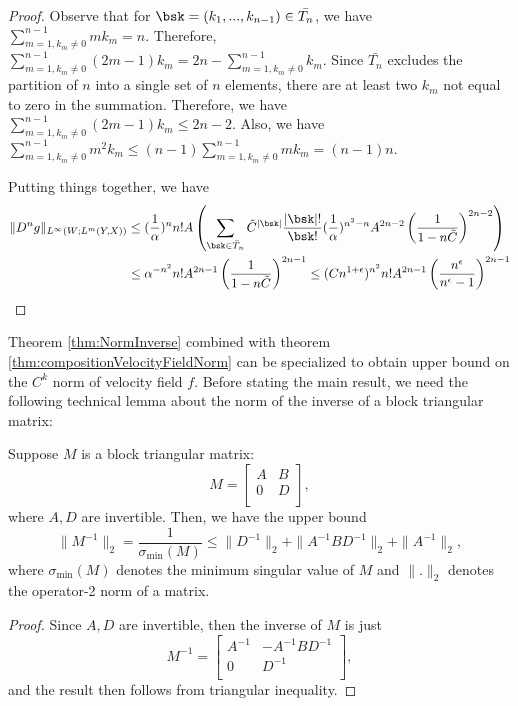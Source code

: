\begin{proof}
Observe that for $\bsk = (k_1,...,k_{n-1}) \in \bar{T_n}$, we have $\sum_{m=1, k_m\neq 0}^{n-1}mk_m = n$. Therefore, $\sum_{m=1, k_m\neq 0}^{n-1}(2m-1)k_m = 2n - \sum_{m=1, k_m\neq 0}^{n-1}k_m$. Since $\bar{T_n}$ excludes the partition of $n$ into a single set of $n$ elements, there are at least two $k_m$ not equal to zero in the summation. Therefore, we have $\sum_{m=1, k_m\neq 0}^{n-1}(2m-1)k_m \leq 2n-2$. Also, we have $\sum_{m=1, k_m\neq 0}^{n-1}m^2k_m  \leq (n-1)\sum_{m=1, k_m\neq 0}^{n-1}mk_m = (n-1)n. $

Putting things together, we have 
\begin{align*}
\|D^ng\|_{L^\infty(W;L^m(Y,X))} &\leq  (\frac{1}{\alpha})^{n}n!A \left ( \sum_{\bsk\in \bar{T}_n}\tilde{C}^{|\bsk|}\frac{|\bsk|!}{\bsk!}(\frac{1}{\alpha})^{n^2-n} A^{2n-2}\left(\frac{1}{1 - n\tilde{C}}\right)^{2n-2} \right)\\
&\leq \alpha^{-n^2}n!A^{2n-1}\left(\frac{1}{1 -n\tilde{C}}\right)^{2n-1} \leq (Cn^{1+\epsilon})^{n^2}n!A^{2n-1}\left(\frac{n^\epsilon}{n^\epsilon - 1}\right)^{2n-1} 
\end{align*}
\end{proof}


Theorem \ref{thm:NormInverse} combined with theorem \ref{thm:compositionVelocityFieldNorm} can be specialized to obtain upper bound on the $C^k$ norm of velocity field $f$. Before stating the main result, we need the following technical lemma about the norm of the inverse of a block triangular matrix:




\begin{lemma}\label{lemma:blockTriangle}
Suppose $M$ is a block triangular matrix: \[
   M =
  \left[ {\begin{array}{cc}
   A & B \\
   0 & D \\
  \end{array} } \right],
\]
where $A, D$ are invertible. Then, we have the upper bound $$\|M^{-1}\|_2 = \frac{1}{\sigma_{\min}(M)} \leq \|D^{-1}\|_2 + \|A^{-1}BD^{-1}\|_2 + \|A^{-1}\|_2,$$ where $\sigma_{\min}(M)$ denotes the minimum singular value of $M$ and $\|.\|_2$ denotes the operator-2 norm of a matrix. 
\end{lemma}
\begin{proof}
Since $A, D$ are invertible, then the inverse of $M$ is just \[
   M^{-1} =
  \left[ {\begin{array}{cc}
   A^{-1} & -A^{-1}BD^{-1} \\
   0 & D^{-1} \\
  \end{array} } \right],
\]
and the result then follows from triangular inequality. 
\end{proof}

